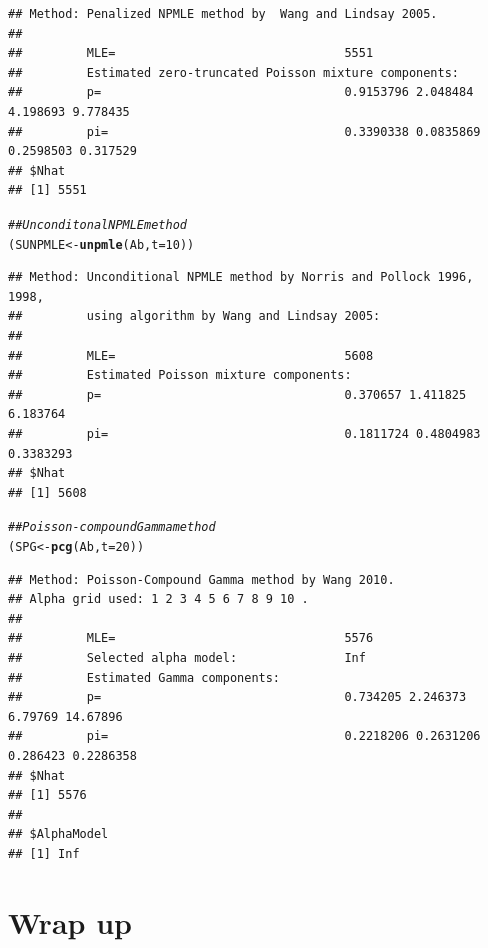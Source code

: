 \documentclass[12pt, A4]{article}\usepackage[]{graphicx}\usepackage[]{color}
\makeatletter
\newcommand{\hlnum}[1]{\textcolor[rgb]{0.686,0.059,0.569}{#1}}%
\newcommand{\hlcom}[1]{\textcolor[rgb]{0.678,0.584,0.686}{\textit{#1}}}%
\newcommand{\hlstd}[1]{\textcolor[rgb]{0.345,0.345,0.345}{#1}}%
\newcommand{\hlkwb}[1]{\textcolor[rgb]{0.69,0.353,0.396}{#1}}%
\newcommand{\hlkwc}[1]{\textcolor[rgb]{0.333,0.667,0.333}{#1}}%
\newcommand{\hlkwd}[1]{\textcolor[rgb]{0.737,0.353,0.396}{\textbf{#1}}}%
\newenvironment{kframe}{%
 \def\at@end@of@kframe{}%
 \ifinner\ifhmode%
  \def\at@end@of@kframe{\end{minipage}}%
  \begin{minipage}{\columnwidth}%
 \fi\fi%
 \def\FrameCommand##1{\hskip\@totalleftmargin \hskip-\fboxsep
 \colorbox{shadecolor}{##1}\hskip-\fboxsep
     \hskip-\linewidth \hskip-\@totalleftmargin \hskip\columnwidth}%
 \MakeFramed {\advance\hsize-\width
   \@totalleftmargin\z@ \linewidth\hsize
   \@setminipage}}%
 {\par\unskip\endMakeFramed%
 \at@end@of@kframe}
\newenvironment{knitrout}{}{} %
\makeatother
\begin{document}
\begin{knitrout}
\begin{kframe}
\begin{alltt}
\end{alltt}
\begin{verbatim}
## Method: Penalized NPMLE method by  Wang and Lindsay 2005. 
## 
##         MLE=                                5551 
##         Estimated zero-truncated Poisson mixture components:       
##         p=                                  0.9153796 2.048484 4.198693 9.778435 
##         pi=                                 0.3390338 0.0835869 0.2598503 0.317529
## $Nhat
## [1] 5551
\end{verbatim}
\begin{alltt}
\hlcom{##Unconditonal NPMLE method}
\hlstd{(SUNPMLE} \hlkwb{<-}\hlkwd{unpmle}\hlstd{(Ab,}\hlkwc{t}\hlstd{=}\hlnum{10}\hlstd{))}
\end{alltt}
\begin{verbatim}
## Method: Unconditional NPMLE method by Norris and Pollock 1996, 1998, 
##         using algorithm by Wang and Lindsay 2005: 
## 
##         MLE=                                5608 
##         Estimated Poisson mixture components:       
##         p=                                  0.370657 1.411825 6.183764 
##         pi=                                 0.1811724 0.4804983 0.3383293
## $Nhat
## [1] 5608
\end{verbatim}
\begin{alltt}
\hlcom{##Poisson-compound Gamma method}
\hlstd{(SPG} \hlkwb{<-} \hlkwd{pcg}\hlstd{(Ab,}\hlkwc{t}\hlstd{=}\hlnum{20}\hlstd{))}
\end{alltt}
\begin{verbatim}
## Method: Poisson-Compound Gamma method by Wang 2010. 
## Alpha grid used: 1 2 3 4 5 6 7 8 9 10 . 
## 
##         MLE=                                5576 
##         Selected alpha model:               Inf 
##         Estimated Gamma components:         
##         p=                                  0.734205 2.246373 6.79769 14.67896 
##         pi=                                 0.2218206 0.2631206 0.286423 0.2286358
## $Nhat
## [1] 5576
## 
## $AlphaModel
## [1] Inf
\end{verbatim}
\end{kframe}
\end{knitrout}

\section*{Wrap up}
\end{document}
